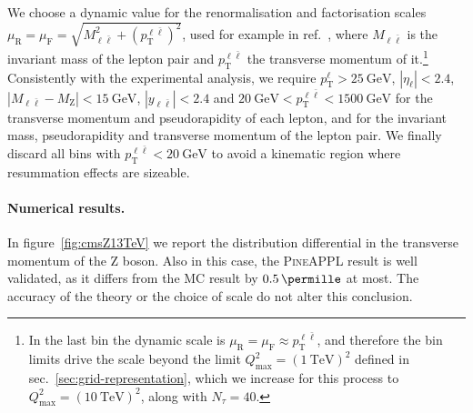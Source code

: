 We choose a dynamic value for the renormalisation and factorisation scales $\mu_\mathrm{R}=\mu_\mathrm{F}=\sqrt{M_{\ell \bar{\ell}}^2 + \left( p_\mathrm{T}^{\ell \bar{\ell}} \right)^2}$, used for example in ref.~\cite{Ridder:2016nkl}, where $M_{\ell \bar{\ell}}$ is the invariant mass of the lepton pair and $p_\mathrm{T}^{\ell \bar{\ell}}$ the transverse momentum of it.\footnote{In the last bin the dynamic scale is $\mu_\mathrm{R} = \mu_\mathrm{F} \approx p_\mathrm{T}^{\ell \bar{\ell}}$, and therefore the bin limits drive the scale beyond the limit $Q_\text{max}^2 = (\SI{1}{\tera\electronvolt})^2$ defined in sec.~\ref{sec:grid-representation}, which we increase for this process to $Q_\text{max}^2 = (\SI{10}{\tera\electronvolt})^2$, along with $N_\tau = 40$.}
Consistently with the
experimental analysis, we require $p_\mathrm{T}^\ell>\SI{25}{\giga\electronvolt}$,
$|\eta_\ell|<2.4$, $|M_{\ell\bar\ell} - M_\mathrm{Z}| < \SI{15}{\giga\electronvolt}$,
$|y_{\ell\bar\ell}|<2.4$ and $\SI{20}{\giga\electronvolt}<p_\mathrm{T}^{\ell\bar\ell}<\SI{1500}{\giga\electronvolt}$ for the
transverse momentum and pseudorapidity of each lepton, and for the invariant
mass, pseudorapidity and transverse momentum of the lepton pair.
We finally discard all bins with
$p_\mathrm{T}^{\ell \bar{\ell}}<\SI{20}{\giga\electronvolt}$ to avoid a kinematic
region where resummation effects are sizeable.

\paragraph{Numerical results.} In figure~\ref{fig:cmsZ13TeV} we report the
distribution differential in the transverse momentum of the Z
boson. Also in this case, the \textsc{PineAPPL} result is well validated, as it
differs from the MC result by $\SI{0.5}{\permille}$ at most. The accuracy of the
theory or the choice of scale do not alter this conclusion.

